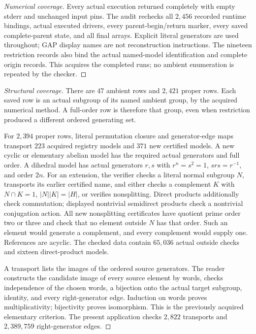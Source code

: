 \documentclass[11pt]{article}
\begin{document}
\begin{proof}[Numerical coverage]
Every actual execution returned completely with empty stderr and unchanged
input pins. The audit rechecks all $2,456$ recorded runtime bindings,
actual executed drivers, every parent-begin/return marker, every saved
complete-parent state, and all final arrays. Explicit literal generators
are used throughout; GAP display names are not reconstruction instructions.
The nineteen restriction records also bind the actual named-model
identification and complete origin records. This acquires the completed
runs; no ambient enumeration is repeated by the checker.
\end{proof}

\begin{proof}[Structural coverage]
There are $47$ ambient rows and $2,421$ proper rows. Each saved row is an
actual subgroup of its named ambient group, by the acquired numerical
method. A full-order row is therefore that group, even when restriction
produced a different ordered generating set.

For $2,394$ proper rows, literal permutation closure and generator-edge
maps transport $223$ acquired registry models and $371$ new certified
models. A new cyclic or elementary abelian model has the required actual
generators and full order. A dihedral model has actual generators
\(r,s\) with \(r^{n}=s^2=1\), \(srs=r^{-1}\), and order \(2n\).
For an extension, the verifier checks a literal normal subgroup \(N\),
transports its earlier certified name, and either checks a complement
\(K\) with \(N\cap K=1\), \(|N||K|=|H|\), or verifies nonsplitting.
Direct products additionally check commutation; displayed nontrivial
semidirect products check a nontrivial conjugation action. All new
nonsplitting certificates have quotient prime order two or three and
check that no element outside \(N\) has that order. Such an element would
generate a complement, and every complement would supply one.
References are acyclic. The checked data contain $65,036$ actual outside
checks and sixteen direct-product models.

A transport lists the images of the ordered source generators. The
reader constructs the candidate image of every source element by words,
checks independence of the chosen words, a bijection onto the actual
target subgroup, identity, and every right-generator edge. Induction on
words proves multiplicativity; bijectivity proves isomorphism. This is
the previously acquired elementary criterion. The present application
checks $2,822$ transports and $2,389,759$ right-generator edges.


\end{proof}
\end{document}

